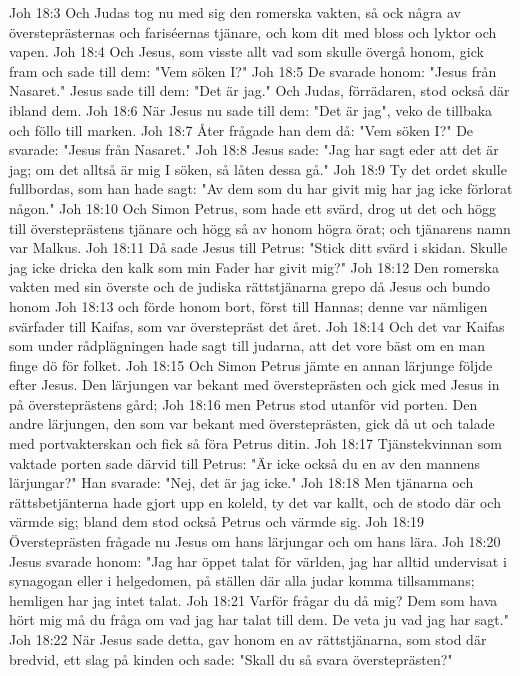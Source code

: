Joh 18:3  Och Judas tog nu med sig den romerska vakten, så ock några av översteprästernas och fariséernas tjänare, och kom dit med bloss och lyktor och vapen.
Joh 18:4  Och Jesus, som visste allt vad som skulle övergå honom, gick fram och sade till dem: "Vem söken I?"
Joh 18:5  De svarade honom: "Jesus från Nasaret." Jesus sade till dem: "Det är jag." Och Judas, förrädaren, stod också där ibland dem.
Joh 18:6  När Jesus nu sade till dem: "Det är jag", veko de tillbaka och föllo till marken.
Joh 18:7  Åter frågade han dem då: "Vem söken I?" De svarade: "Jesus från Nasaret."
Joh 18:8  Jesus sade: "Jag har sagt eder att det är jag; om det alltså är mig I söken, så låten dessa gå."
Joh 18:9  Ty det ordet skulle fullbordas, som han hade sagt: "Av dem som du har givit mig har jag icke förlorat någon."
Joh 18:10  Och Simon Petrus, som hade ett svärd, drog ut det och högg till översteprästens tjänare och högg så av honom högra örat; och tjänarens namn var Malkus.
Joh 18:11  Då sade Jesus till Petrus: "Stick ditt svärd i skidan. Skulle jag icke dricka den kalk som min Fader har givit mig?"
Joh 18:12  Den romerska vakten med sin överste och de judiska rättstjänarna grepo då Jesus och bundo honom
Joh 18:13  och förde honom bort, först till Hannas; denne var nämligen svärfader till Kaifas, som var överstepräst det året.
Joh 18:14  Och det var Kaifas som under rådplägningen hade sagt till judarna, att det vore bäst om en man finge dö för folket.
Joh 18:15  Och Simon Petrus jämte en annan lärjunge följde efter Jesus. Den lärjungen var bekant med översteprästen och gick med Jesus in på översteprästens gård;
Joh 18:16  men Petrus stod utanför vid porten. Den andre lärjungen, den som var bekant med översteprästen, gick då ut och talade med portvakterskan och fick så föra Petrus ditin.
Joh 18:17  Tjänstekvinnan som vaktade porten sade därvid till Petrus: "Är icke också du en av den mannens lärjungar?" Han svarade: "Nej, det är jag icke."
Joh 18:18  Men tjänarna och rättsbetjänterna hade gjort upp en koleld, ty det var kallt, och de stodo där och värmde sig; bland dem stod också Petrus och värmde sig.
Joh 18:19  Översteprästen frågade nu Jesus om hans lärjungar och om hans lära.
Joh 18:20  Jesus svarade honom: "Jag har öppet talat för världen, jag har alltid undervisat i synagogan eller i helgedomen, på ställen där alla judar komma tillsammans; hemligen har jag intet talat.
Joh 18:21  Varför frågar du då mig? Dem som hava hört mig må du fråga om vad jag har talat till dem. De veta ju vad jag har sagt."
Joh 18:22  När Jesus sade detta, gav honom en av rättstjänarna, som stod där bredvid, ett slag på kinden och sade: "Skall du så svara översteprästen?"
